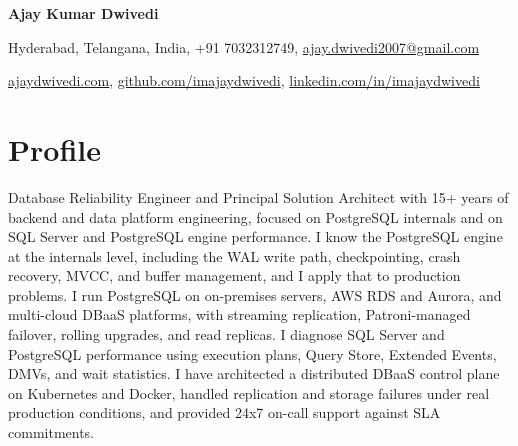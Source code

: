 \documentclass[10pt,a4paper]{article}
\begin{document}
\begin{center}
{\Huge\bfseries Ajay Kumar Dwivedi}

\vspace{6pt}
Hyderabad, Telangana, India, +91 7032312749, \href{mailto:ajay.dwivedi2007@gmail.com}{ajay.dwivedi2007@gmail.com}

\vspace{2pt}
\href{https://ajaydwivedi.com/}{ajaydwivedi.com}, \href{https://github.com/imajaydwivedi}{github.com/imajaydwivedi}, \href{https://linkedin.com/in/imajaydwivedi/}{linkedin.com/in/imajaydwivedi}
\end{center}

\section{Profile}
Database Reliability Engineer and Principal Solution Architect with 15+ years of backend and data platform engineering, focused on PostgreSQL internals and on SQL Server and PostgreSQL engine performance. I know the PostgreSQL engine at the internals level, including the WAL write path, checkpointing, crash recovery, MVCC, and buffer management, and I apply that to production problems. I run PostgreSQL on on-premises servers, AWS RDS and Aurora, and multi-cloud DBaaS platforms, with streaming replication, Patroni-managed failover, rolling upgrades, and read replicas. I diagnose SQL Server and PostgreSQL performance using execution plans, Query Store, Extended Events, DMVs, and wait statistics. I have architected a distributed DBaaS control plane on Kubernetes and Docker, handled replication and storage failures under real production conditions, and provided 24x7 on-call support against SLA commitments.
\end{document}
